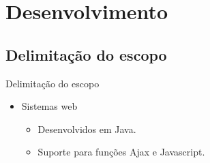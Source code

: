 \documentclass{beamer}
\begin{document}
\section{Desenvolvimento}
\subsection{Delimitação do escopo}
\begin{frame}{Delimitação do escopo}
	\begin{itemize}
		\item Sistemas web
		\begin{itemize}
			\item Desenvolvidos em Java.
			\item Suporte para funções Ajax e Javascript.
		\end{itemize}
	\end{itemize}
\end{frame}
\end{document}
